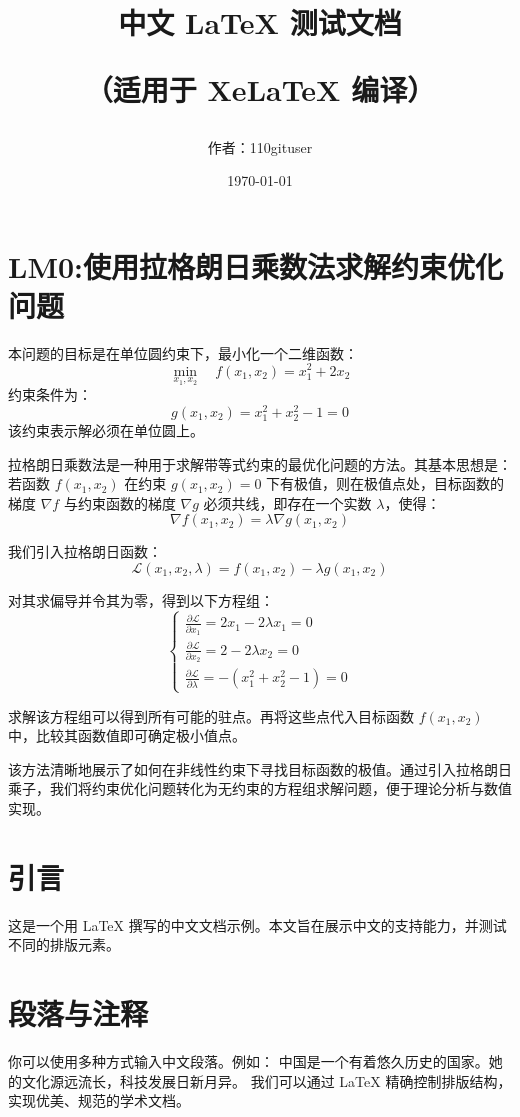 \documentclass[12pt]{article}
\title{\Huge 中文 LaTeX 测试文档\par \vspace{1em} \Large（适用于 XeLaTeX 编译）}
\author{\large 作者：110gituser\\}
\date{\today}
\begin{document}
\maketitle
\cleardoublepage
\tableofcontents
\cleardoublepage

\section{LM0:使用拉格朗日乘数法求解约束优化问题}

本问题的目标是在单位圆约束下，最小化一个二维函数：
\[
\min_{x_1, x_2} \quad f(x_1, x_2) = x_1^2 + 2x_2
\]
约束条件为：
\[
g(x_1, x_2) = x_1^2 + x_2^2 - 1 = 0
\]
该约束表示解必须在单位圆上。

拉格朗日乘数法是一种用于求解带等式约束的最优化问题的方法。其基本思想是：若函数 \( f(x_1, x_2) \) 在约束 \( g(x_1, x_2) = 0 \) 下有极值，则在极值点处，目标函数的梯度 \( \nabla f \) 与约束函数的梯度 \( \nabla g \) 必须共线，即存在一个实数 \( \lambda \)，使得：
\[
\nabla f(x_1, x_2) = \lambda \nabla g(x_1, x_2)
\]

我们引入拉格朗日函数：
\[
\mathcal{L}(x_1, x_2, \lambda) = f(x_1, x_2) - \lambda g(x_1, x_2)
\]

对其求偏导并令其为零，得到以下方程组：
\[
\begin{cases}
\frac{\partial \mathcal{L}}{\partial x_1} = 2x_1 - 2\lambda x_1 = 0 \\
\frac{\partial \mathcal{L}}{\partial x_2} = 2 - 2\lambda x_2 = 0 \\
\frac{\partial \mathcal{L}}{\partial \lambda} = - (x_1^2 + x_2^2 - 1) = 0
\end{cases}
\]

求解该方程组可以得到所有可能的驻点。再将这些点代入目标函数 \( f(x_1, x_2) \) 中，比较其函数值即可确定极小值点。


该方法清晰地展示了如何在非线性约束下寻找目标函数的极值。通过引入拉格朗日乘子，我们将约束优化问题转化为无约束的方程组求解问题，便于理论分析与数值实现。

\section{引言}
这是一个用 \LaTeX{} 撰写的中文文档示例。本文旨在展示中文的支持能力，并测试不同的排版元素。
\section{段落与注释}
你可以使用多种方式输入中文段落。例如：
中国是一个有着悠久历史的国家。她的文化源远流长，科技发展日新月异。
我们可以通过 \LaTeX{} 精确控制排版结构，实现优美、规范的学术文档。
\end{document}
